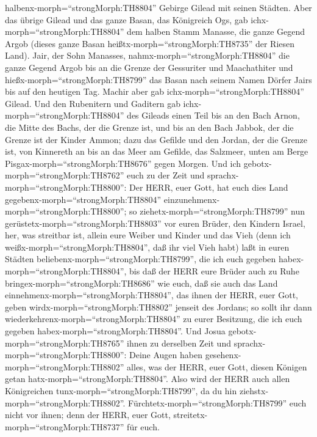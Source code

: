 halbenx-morph=``strongMorph:TH8804'' Gebirge Gilead mit seinen Städten.
 Aber das übrige Gilead und das ganze Basan, das Königreich
Ogs, gab ichx-morph=``strongMorph:TH8804'' dem halben Stamm Manasse, die
ganze Gegend Argob (dieses ganze Basan
heißtx-morph=``strongMorph:TH8735'' der Riesen Land). 
Jair, der Sohn Manasses, nahmx-morph=``strongMorph:TH8804'' die ganze
Gegend Argob bis an die Grenze der Gessuriter und Maachathiter und
hießx-morph=``strongMorph:TH8799'' das Basan nach seinem Namen Dörfer
Jairs bis auf den heutigen Tag.  Machir aber gab
ichx-morph=``strongMorph:TH8804'' Gilead.  Und den
Rubenitern und Gaditern gab ichx-morph=``strongMorph:TH8804'' des
Gileads einen Teil bis an den Bach Arnon, die Mitte des Bachs, der die
Grenze ist, und bis an den Bach Jabbok, der die Grenze ist der Kinder
Ammon;  dazu das Gefilde und den Jordan, der die Grenze
ist, von Kinnereth an bis an das Meer am Gefilde, das Salzmeer, unten am
Berge Pisgax-morph=``strongMorph:TH8676'' gegen Morgen. 
Und ich gebotx-morph=``strongMorph:TH8762'' euch zu der Zeit und
sprachx-morph=``strongMorph:TH8800'': Der HERR, euer Gott, hat euch dies
Land gegebenx-morph=``strongMorph:TH8804''
einzunehmenx-morph=``strongMorph:TH8800''; so
ziehetx-morph=``strongMorph:TH8799'' nun
gerüstetx-morph=``strongMorph:TH8803'' vor euren Brüder, den Kindern
Israel, her, was streitbar ist,  allein eure Weiber und
Kinder und das Vieh (denn ich weißx-morph=``strongMorph:TH8804'', daß
ihr viel Vieh habt) laßt in euren Städten
beliebenx-morph=``strongMorph:TH8799'', die ich euch gegeben
habex-morph=``strongMorph:TH8804'',  bis daß der HERR eure
Brüder auch zu Ruhe bringex-morph=``strongMorph:TH8686'' wie euch, daß
sie auch das Land einnehmenx-morph=``strongMorph:TH8804'', das ihnen der
HERR, euer Gott, geben wirdx-morph=``strongMorph:TH8802'' jenseit des
Jordans; so sollt ihr dann wiederkehrenx-morph=``strongMorph:TH8804'' zu
eurer Besitzung, die ich euch gegeben
habex-morph=``strongMorph:TH8804''.  Und Josua
gebotx-morph=``strongMorph:TH8765'' ihnen zu derselben Zeit und
sprachx-morph=``strongMorph:TH8800'': Deine Augen haben
gesehenx-morph=``strongMorph:TH8802'' alles, was der HERR, euer Gott,
diesen Königen getan hatx-morph=``strongMorph:TH8804''. Also wird der
HERR auch allen Königreichen tunx-morph=``strongMorph:TH8799'', da du
hin ziehstx-morph=``strongMorph:TH8802''. 
Fürchtetx-morph=``strongMorph:TH8799'' euch nicht vor ihnen; denn der
HERR, euer Gott, streitetx-morph=``strongMorph:TH8737'' für euch.
